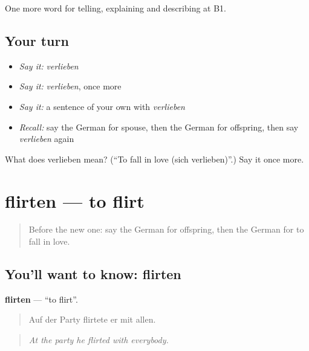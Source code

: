 \begin{grammarlens}[title={What you've built}]
One more word for telling, explaining and describing at B1.
\end{grammarlens}

\subsection*{Your turn}
\begin{itemize}
\raggedright
  \item \emph{Say it:} \emph{verlieben}
  \item \emph{Say it:} \emph{verlieben}, once more
  \item \emph{Say it:} a sentence of your own with \emph{verlieben}
  \item \emph{Recall:} say the German for spouse, then the German for offspring, then say \emph{verlieben} again
\end{itemize}

\begin{tcolorbox}[breakable,colback=teal!4,colframe=teal!35!black,title={Before you move on}]
What does verlieben mean? (\textquotedblleft{}To fall in love (sich verlieben)\textquotedblright{}.) Say it once more.
\end{tcolorbox}
\section[flirten]{flirten — to flirt}

\label{lesson:GE-C492-flirten}



\begin{quote}
Before the new one: say the German for offspring, then the German for to fall in love.
\end{quote}

\subsection*{You'll want to know: flirten}
\textbf{flirten} — \textquotedblleft{}to flirt\textquotedblright{}.

\begin{quote}
Auf der Party flirtete er mit allen.
\end{quote}

\begin{quote}
\emph{At the party he flirted with everybody.}
\end{quote}

